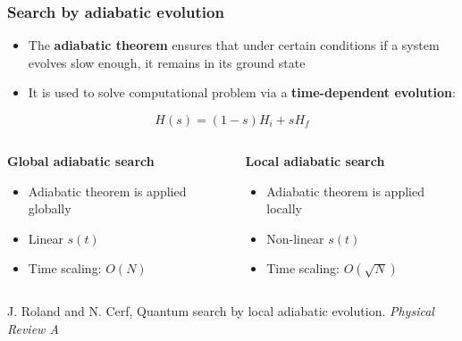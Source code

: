 \documentclass{beamer}
\newcommand{\bb}[1]{\textbf{\textcolor{darkish_blue}{#1}}}
\begin{document}
\begin{frame}
\frametitle{Search by adiabatic evolution}

\vspace{-0.3cm}
\begin{itemize}
	\item The \bb{adiabatic theorem} ensures that under certain conditions if a system evolves slow enough, it remains in its ground state
	\item It is used to solve computational problem via a \bb{time-dependent evolution}: 
\end{itemize}
\centering
\begin{tcolorbox}[width=4.0cm, colframe=darkblue, colback=white, halign=center, left=1pt, right=1pt, top=-11pt, bottom=1pt]
	\begin{equation*}
		H(s) = (1-s)H_i + sH_f
	\end{equation*}
\end{tcolorbox}

\vspace{0.5cm}
\begin{columns}

	\begin{column}[T]{0.4\textwidth}
	\bb{Global adiabatic search}
	\begin{itemize}
		\item Adiabatic theorem is applied globally
		\item Linear $s(t)$
		\item Time scaling: $O(N)$
	\end{itemize}
	\end{column}

	\begin{column}[T]{0.4\textwidth}
	\bb{Local adiabatic search}
	\begin{itemize}
		\item Adiabatic theorem is applied locally
		\item Non-linear $s(t)$
		\item Time scaling: $O(\sqrt{N})$
	\end{itemize}
	\end{column}

\end{columns}

\vspace{0.8cm}
\footnotesize J. Roland and N. Cerf, Quantum search by local adiabatic evolution. \textit{Physical Review A}
\end{frame}

\end{document}
